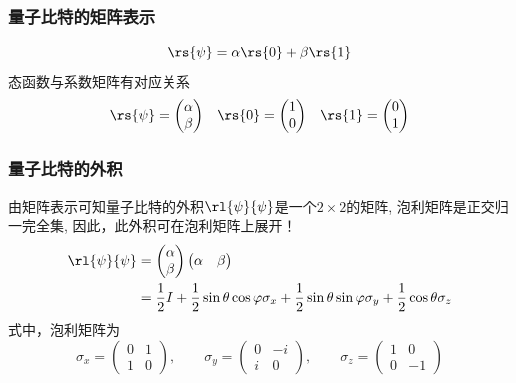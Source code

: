 \begin{frame} 
    \frametitle{量子比特的矩阵表示}
    \[\rs{\psi} =\alpha\rs{0}+\beta\rs{1} \] 
    态函数与系数矩阵有对应关系\\
   \[
    \begin{matrix} 
    \rs{\psi} =\begin{pmatrix}
            \alpha\\
            \beta
    \end{pmatrix}
    &    
    \rs{0} 
    =\begin{pmatrix}
        1\\
        0
    \end{pmatrix}
    &
    \rs{1} 
    =\begin{pmatrix}
        0\\
        1
    \end{pmatrix}
    \end{matrix}    
    \]
\end{frame}

\begin{frame} 
    \frametitle{量子比特的外积}
    由矩阵表示可知量子比特的外积$\rl{\psi}{\psi}$是一个$2\times 2$的矩阵,
    泡利矩阵是正交归一完全集,
    因此，此外积可在泡利矩阵上展开！
    \[\begin{aligned}
    \rl{\psi}{\psi} 
    &=
    \begin{pmatrix}
        \alpha\\
        \beta
    \end{pmatrix}
    \begin{pmatrix}
        \alpha & \beta
    \end{pmatrix}
 \\
    &= \frac{1}{2}I +\frac{1}{2}\sin\theta\cos\varphi\sigma_x +\frac{1}{2}\sin\theta\sin\varphi\sigma_y+ \frac{1}{2}\cos\theta\sigma_z 
\end{aligned}\]
式中，泡利矩阵为
\[
\sigma_x =
\begin{pmatrix}
    0 & 1 \\
    1 & 0 
\end{pmatrix}, \qquad
\sigma_y =
\begin{pmatrix}
    0 & -i \\
    i & 0 
\end{pmatrix}, \qquad
\sigma_z =
\begin{pmatrix}
    1 & 0 \\
    0 & -1 
\end{pmatrix}
\]
\end{frame}

